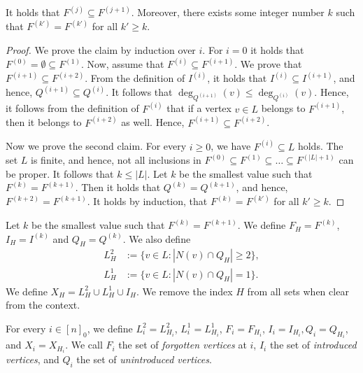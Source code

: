 \documentclass[a4paper,UKenglish,cleveref, autoref, thm-restate]{lipics-v2021}
\begin{document}
\begin{lemma}
    It holds that $F^{(j)} \subseteq F^{(j+1)}$. Moreover, there exists some integer number $k$ such that $F^{(k')} = F^{(k')}$ for all $k'\geq k$.
\end{lemma}

\begin{proof}
    We prove the claim by induction over $i$. For $i=0$ it holds that $F^{(0)} = \emptyset \subseteq F^{(1)}$. Now, assume that $F^{(i)} \subseteq F^{(i+1)}$. We prove that $F^{(i+1)} \subseteq F^{(i+2)}$. From the definition of $I^{(i)}$, it holds that $I^{(i)} \subseteq I^{(i+1)}$, and hence, $Q^{(i+1)} \subseteq Q^{(i)}$. It follows that $\deg_{Q^{(i+1)}}(v) \leq \deg_{Q^{(i)}}(v)$. Hence, it follows from the definition of $F^{(i)}$ that if a vertex $v\in L$ belongs to $F^{(i+1)}$, then it belongs to $F^{(i+2)}$ as well. Hence, $F^{(i+1)} \subseteq F^{(i+2)}$.

    Now we prove the second claim.
    For every $i \geq 0$, we have $F^{(i)} \subseteq L$ holds. 
    The set $L$ is finite, and hence, not all inclusions in $F^{(0)} \subseteq F^{(1)} \subseteq \dots \subseteq F^{(|L|+1)}$ can be proper. It follows that $k \leq |L|$. Let $k$ be the smallest value such that $F^{(k)} = F^{(k+1)}$. Then it holds that $Q^{(k)} = Q^{(k+1)}$, and hence, $F^{(k+2)} = F^{(k+1)}$. It holds by induction, that $F^{(k)} = F^{(k')}$ for all $k'\geq k$.
\end{proof}

\begin{definition}
    Let $k$ be the smallest value such that $F^{(k)} = F^{(k+1)}$. 
    We define $F_H = F^{(k)}$, $I_H = I^{(k)}$ and $Q_H = Q^{(k)}$. We also define
    \begin{align*}
        L^2_H &:= \{v\in L\colon |N(v)\cap Q_H| \geq 2\},\\
        L^1_H &:= \{v\in L\colon |N(v)\cap Q_H| = 1\}.
    \end{align*}
    We define $X_H = L^2_H \cup L^1_H \cup I_H$.
    We remove the index $H$ from all sets when clear from the context.
\end{definition}

    For every $i\in[n]_0$, we define $L^2_i = L^2_{H_i}$, $L^1_i = L^1_{H_i}$, $F_i = F_{H_i}$, $I_i = I_{H_i}, Q_i = Q_{H_i}$, and $X_i = X_{H_i}$.
    We call $F_i$ the set of \emph{forgotten vertices} at $i$, $I_i$ the set of \emph{introduced vertices}, and $Q_i$ the set of \emph{unintroduced vertices}.
\end{document}
